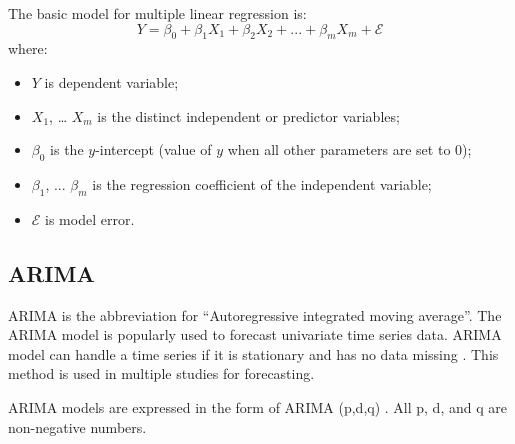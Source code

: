 \documentclass{ieeeojies}
\begin{document}
The basic model for multiple linear regression is:
\begin{equation}
    Y = \beta_0 + \beta_1X_1 + \beta_2X_2 + ... + \beta_mX_m + \mathcal{E}
\end{equation}
where:
\begin{itemize}
    \item $Y$ is dependent variable;
    \item $X_1$, … $X_m$ is the distinct independent or predictor variables;
    \item $\beta_0$ is the $y$-intercept (value of $y$ when all other parameters are set to 0);
    \item $\beta_1$, ... $\beta_m$ is the regression coefficient of the independent variable;
    \item $\mathcal{E}$ is model error.
\end{itemize}
\subsection{ARIMA}
ARIMA is the abbreviation for “Autoregressive integrated moving average”. The ARIMA model is popularly used to forecast univariate time series data. ARIMA model can handle a time series if it is stationary and has no data missing \cite{b6}. This method is used in multiple studies for forecasting.

ARIMA models are expressed in the form of ARIMA (p,d,q) \cite{b7}. All p, d, and q are non-negative numbers.
\end{document}

